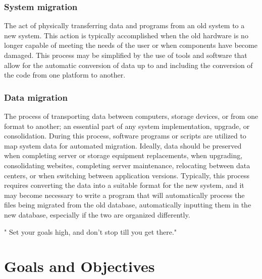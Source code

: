    \subsection*{System migration}   
The act of physically transferring data and programs from an old system to a new system. This action is typically accomplished when the old hardware is no longer capable of meeting the needs of the user or when components have become damaged. This process may be simplified by the use of tools and software that allow for the automatic conversion of data up to and including the conversion of the code from one platform to another. 
   \subsection*{Data migration}
   The process of transporting data between computers, storage devices, or from one format to another; an essential part of any system implementation, upgrade, or consolidation. During this process, software programs or scripts are utilized to map system data for automated migration. Ideally, data should be preserved when completing server or storage equipment replacements, when upgrading, consolidating websites, completing server maintenance, relocating between data centers, or when switching between application versions. Typically, this process requires converting the data into a suitable format for the new system, and it may become necessary to write a program that will automatically process the files being migrated from the old database, automatically inputting them in the new database, especially if the two are organized differently. 

      \newpage
      \begin{savequote}[108mm]
       " Set your goals high, and don't stop till you get there."
      \end{savequote}
      \chapter{Goals and Objectives}
      \vspace{-3cm}
      \label{chap:Goals}

